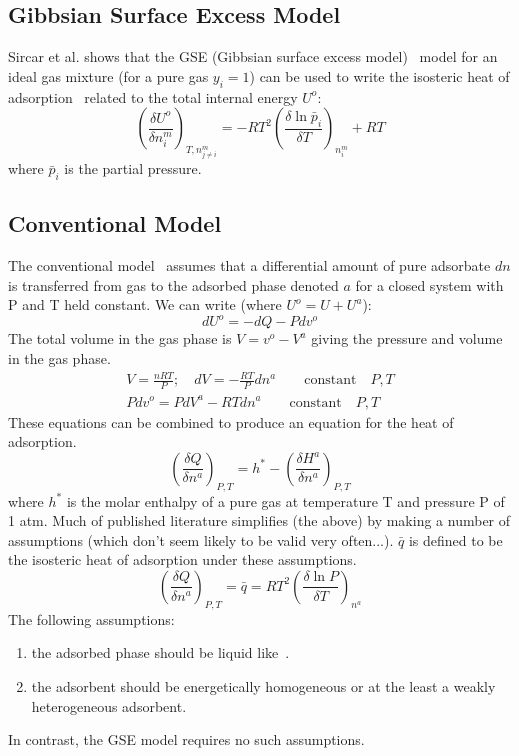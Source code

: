 \documentclass[letterpaper,twocolumn,amsmath,amssymb,jcp,aps,10pt]{revtex4-1}
\begin{document}
\subsection{Gibbsian Surface Excess Model}
Sircar et al. shows that the GSE (Gibbsian surface excess model)~\cite{sircar1999heat} model for an ideal gas mixture (for a pure gas $y_i = 1$) can be used to write the isosteric heat of adsorption~\cite{sircar1999isosteric} related to the total internal energy $U^o$:
\begin{equation}
    \left( \frac{\delta U^o}{\delta n_i^m}\right)_{T,n_{j\neq i}^m} = -R T^2\left( \frac{\delta \ln \bar p_i}{\delta T} \right)_{n_i^m} + RT
\end{equation}
where $\bar p_i$ is the partial pressure.
\subsection{Conventional Model}
The conventional model~\cite{sircar1999isosteric} assumes that a differential amount of pure
adsorbate $dn$ is transferred from gas to the adsorbed phase denoted $a$ for a closed system with
P and T held constant.  We can write (where $U^o=U+U^a$):
\begin{equation}
    dU^o = -dQ - Pdv^o
\end{equation}
The total volume in the gas phase is $V=v^o-V^a$ giving the pressure and volume in the gas phase.
\begin{align}
    V=\frac{nRT}{P}; \quad dV = -\frac{RT}{P}dn^a \qquad \textrm{constant} \quad P,T \\
    Pdv^o=PdV^a - RTdn^a \qquad \textrm{constant} \quad P,T
\end{align}
These equations can be combined to produce an equation for the heat of adsorption.
\begin{equation}
    \left( \frac{\delta Q}{\delta n^a}\right)_{P,T} = h^* - \left( \frac{\delta H^a}{\delta n^a}\right)_{P,T}
\end{equation}
where $h^*$ is the molar enthalpy of a pure gas at temperature T and pressure P of 1 atm. Much of
published literature simplifies (the above) by making a number of assumptions (which don't seem likely to
be valid very often...). $\bar q$ is defined to be the isosteric heat of adsorption under these assumptions.
\begin{equation}
    \left( \frac{\delta Q}{\delta n^a}\right)_{P,T} = \bar q = R T^2\left( \frac{\delta \ln P}{\delta T} \right)_{n^a}
\end{equation}
The following assumptions:
\begin{enumerate}
    \item the adsorbed phase should be liquid like~\cite{young1962physical}.
    \item the adsorbent should be energetically homogeneous or at the least a weakly heterogeneous adsorbent.
\end{enumerate}
In contrast, the GSE model requires no such assumptions.
\end{document}
